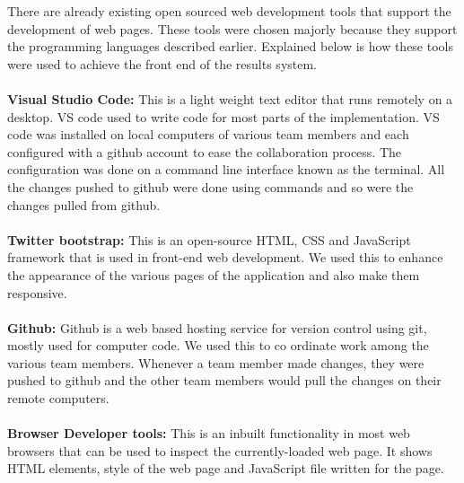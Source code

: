 There are already existing open sourced web development tools that support the development of web pages. These tools were chosen majorly because they support the programming languages described earlier. Explained below is how these tools were used to achieve the front end of the results system.\\~\\
\textbf{Visual Studio Code: }This is a light weight text editor that runs remotely on a desktop. VS code  used to write code for most parts of the implementation. VS code was installed on local computers of various team members and each configured with a github account to ease the collaboration process. The configuration was done on a command line interface known as the terminal. All the changes pushed to github were done using commands and so were the changes pulled from github.\\\\
\textbf{Twitter bootstrap: }This is an open-source HTML, CSS and JavaScript framework that is used in front-end web development. We used this to enhance the appearance of the various pages of the application and also make them responsive. \\\\
\textbf{Github: }Github is a web based hosting service for version control using git, mostly used for computer code. We used this to co ordinate work among the various team members. Whenever a team member made changes, they were pushed to github and the other team members would pull the changes on their remote computers.\\~\\
\textbf{Browser Developer tools: }This is an inbuilt functionality in most web browsers that can be used to inspect the currently-loaded web page. It shows HTML elements, style of the web page and JavaScript file written for the page.

